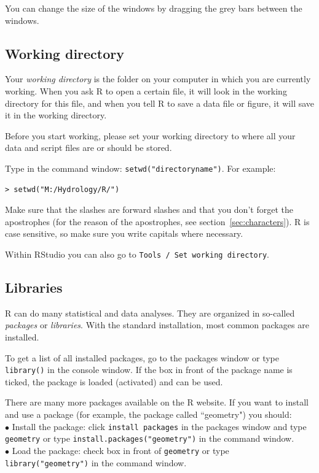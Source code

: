 \documentclass[a4paper,11pt,twocolumn,tablecaptionabove]{scrartcl}
\begin{document}
You can change the size of the windows by dragging the grey bars between the windows.

\subsection{Working directory}

Your \emph{working directory} is the folder on your computer in which you are currently working. When you ask R to open a certain file, it will look in the working directory for this file, and when you tell R to save a data file or figure, it will save it in the working directory.

Before you start working, please set your working directory to where all your data and script files are or should be stored.

Type in the command window: \verb!setwd("directoryname")!.  For example:
\begin{Verbatim}[frame=single,gobble=0]
> setwd("M:/Hydrology/R/")
\end{Verbatim}
Make sure that the slashes are forward slashes and that you don't forget the apostrophes (for the reason of the apostrophes, see section~\ref{sec:characters}). R is case sensitive, so make sure you write capitals where necessary.

Within RStudio you can also go to \texttt{Tools / Set working directory}.

\subsection{Libraries} 

R can do many statistical and data analyses. 
They are organized in so-called \emph{packages} or \emph{libraries}. 
With the standard installation, most common packages are installed.  

To get a list of all installed packages, go to the packages window or type \verb!library()! in the console window. 
If the box in front of the package name is ticked, the package is loaded (activated) and can be used. 

There are many more packages available on the R website.
If you want to install and use a package (for example, the package called ``geometry") you should:\\
\noindent $\bullet$ Install the package:  click \texttt{install packages} in the packages window and type \texttt{geometry} or type \verb!install.packages("geometry")! in the command window.\\
\noindent $\bullet$ Load the package: check box in front of \texttt{geometry} or type \verb!library("geometry")! in the command window. 
\end{document}
